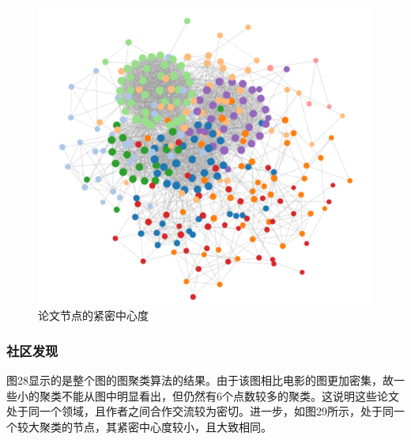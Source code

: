 \documentclass[UTF8, onecolumn, a4paper]{article}
\begin{document}
\begin{center}
\begin{figure}[ht]
\begin{minipage}[b]{0.95\linewidth}
\begin{minipage}[b]{0.46\linewidth}
				\includegraphics[width=\linewidth]{../pictures/show20}
				\caption{论文节点的紧密中心度}
			\end{minipage}
		\end{minipage}
	\end{figure}
\end{center}
\subsubsection{社区发现}
    图28显示的是整个图的图聚类算法的结果。由于该图相比电影的图更加密集，故一些小的聚类不能从图中明显看出，但仍然有6个点数较多的聚类。这说明这些论文处于同一个领域，且作者之间合作交流较为密切。进一步，如图29所示，处于同一个较大聚类的节点，其紧密中心度较小，且大致相同。
    
\end{document}
